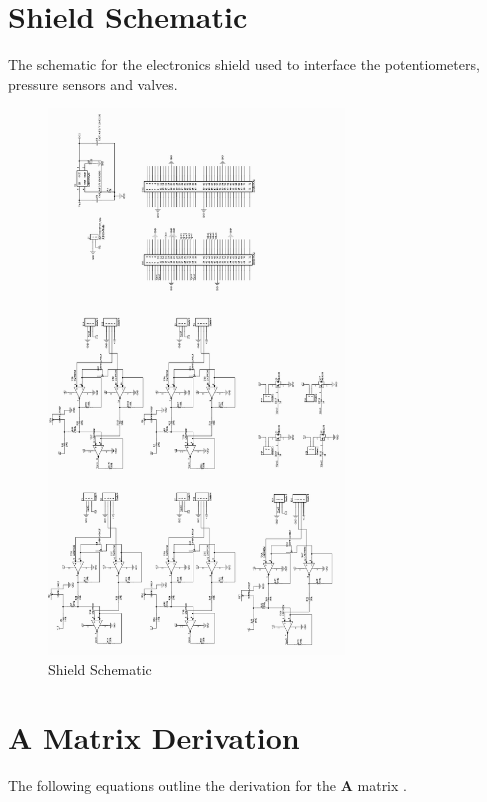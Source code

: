 \documentclass[11pt,a4paper]{article}
\begin{document}
\begin{appendices}
\clearpage
\section{Shield Schematic}
\label{sub:shieldshecmatic}
The schematic for the electronics shield used to interface the potentiometers, pressure sensors and valves. 
\begin{figure}[hbt!]
    \centering
    \includegraphics[origin=c, clip, trim=0cm 0cm 0cm 0cm, width=0.7\textwidth]{ShieldSCH_crop.pdf}
    \caption{Shield Schematic}
    \label{fig:shield_SCH}
\end{figure}
    
\clearpage
\section{A Matrix Derivation}
\label{sub:Amatderive}
The following equations outline the derivation for the $\boldsymbol{A}$ matrix .\newline


\end{appendices}
\end{document}
